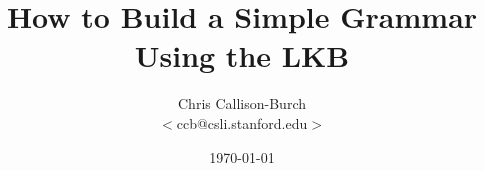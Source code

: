 \documentclass[11pt]{article}
\begin{document}
\title{How to Build a Simple Grammar Using the LKB}
\author{Chris Callison-Burch\\
       $<$ccb@csli.stanford.edu$>$}
\date{\today}

\maketitle 







\end{document}
